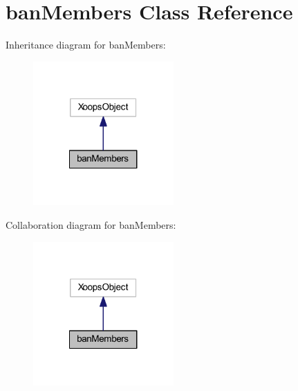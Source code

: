\hypertarget{classban_members}{\section{ban\-Members Class Reference}
\label{classban_members}
}


Inheritance diagram for ban\-Members\-:
\nopagebreak
\begin{figure}[H]
\begin{center}
\leavevmode
\includegraphics[width=152pt]{classban_members__inherit__graph}
\end{center}
\end{figure}


Collaboration diagram for ban\-Members\-:
\nopagebreak
\begin{figure}[H]
\begin{center}
\leavevmode
\includegraphics[width=152pt]{classban_members__coll__graph}
\end{center}
\end{figure}
